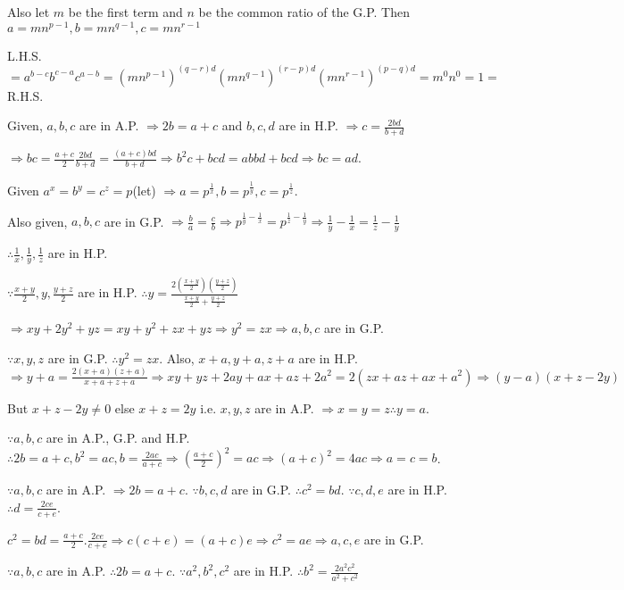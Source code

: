   Also let $m$ be the first term and $n$ be the common ratio of the G.P. Then $a = mn^{p - 1}, b = mn^{q - 1}, c = mn^{r
    -1}$

  L.H.S. $= a^{b - c}b^{c - a}c^{a - b} = (mn^{p - 1})^{(q - r)d}(mn^{q - 1})^{(r - p)d}(mn^{r - 1})^{(p -
    q)d} = m^0n^0 = 1 =$ R.H.S.
\item Given, $a, b, c$ are in A.P. $\Rightarrow 2b = a + c$ and $b, c, d$ are in H.P. $\Rightarrow c =
  \frac{2bd}{b + d}$

  $\Rightarrow bc = \frac{a + c}{2}\frac{2bd}{b + d} = \frac{(a + c)bd}{b + d} \Rightarrow b^2c + bcd = abbd
  + bcd \Rightarrow bc = ad$.
\item Given $a^x = b^y = c^z = p$(let) $\Rightarrow a = p^{\tfrac{1}{x}}, b = p^{\tfrac{1}{y}}, c =
  p^{\frac{1}{z}}$.

  Also given, $a, b, c$ are in G.P. $\Rightarrow \frac{b}{a} = \frac{c}{b} \Rightarrow p^{\tfrac{1}{y} -
    \tfrac{1}{x}} = p^{\tfrac{1}{z} - \tfrac{1}{y}} \Rightarrow \frac{1}{y} - \frac{1}{x} = \frac{1}{z} -
  \frac{1}{y}$

  $\therefore \frac{1}{x}, \frac{1}{y}, \frac{1}{z}$ are in H.P.
\item $\because \frac{x + y}{2}, y, \frac{y + z}{2}$ are in H.P. $\therefore y = \frac{2\left(\tfrac{x +
    y}{2}\right)\left(\tfrac{y + z}{2}\right)}{\tfrac{x + y}{2} + \tfrac{y + z}{2}}$

  $\Rightarrow xy + 2y^2 + yz = xy + y^2 + zx + yz \Rightarrow y^2 = zx \Rightarrow a, b, c$ are in G.P.
\item $\because x, y, z$ are in G.P. $\therefore y^2 = zx$. Also, $x + a, y + a, z + a$ are in
  H.P. $\Rightarrow y + a = \frac{2(x + a)(z + a)}{x + a + z + a} \Rightarrow xy + yz + 2ay + ax + az + 2a^2
  = 2(zx + az + ax + a^2)\Rightarrow (y - a)(x + z - 2y)$

  But $x + z - 2y \neq 0$ else $x + z = 2y$ i.e. $x, y, z$ are in A.P. $\Rightarrow x = y = z \therefore y =
  a$.
\item $\because a, b, c$ are in A.P., G.P. and H.P. $\therefore 2b = a + c, b^2 = ac, b = \frac{2ac}{a + c}
  \Rightarrow \left(\frac{a + c}{2}\right)^2 = ac \Rightarrow (a + c)^2 = 4ac \Rightarrow a = c = b$.
\item $\because a, b, c$ are in A.P. $\Rightarrow 2b = a + c$. $\because b, c, d$ are in G.P. $\therefore
  c^2 = bd$. $\because c, d, e$ are in H.P. $\therefore d = \frac{2ce}{c + e}$.

  $c^2 = bd = \frac{a + c}{2}.\frac{2ce}{c + e} \Rightarrow c(c + e) = (a + c)e \Rightarrow c^2 = ae
  \Rightarrow a, c, e$ are in G.P.
\item $\because a, b, c$ are in A.P. $\therefore 2b = a + c$. $\because a^2, b^2, c^2$ are in
  H.P. $\therefore b^2 = \frac{2a^2c^2}{a^2 + c^2}$

